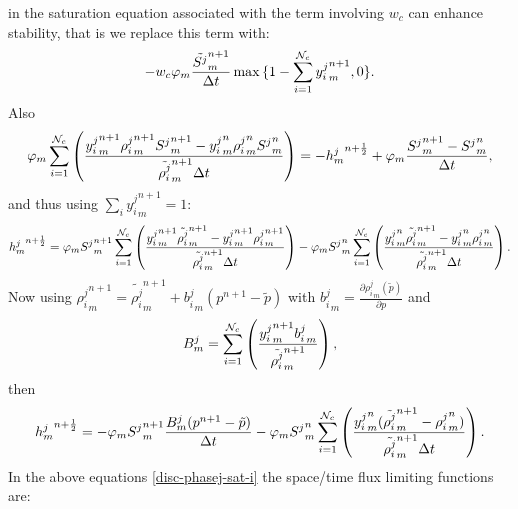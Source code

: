 in the saturation equation associated with the term involving $w_c$ can enhance 
stability, that is we replace this term with: 
\begin{eqnarray}
-w_c \phi_m\frac{\tilde{ S^j}_m^{n+1}}{\Delta t}  \max{ \{
1- \sum_{i=1}^{{\cal N}_c} { y_{i}^{j}}_m^{n+1} , 0\} }  . 
\end{eqnarray} 
Also
\begin{eqnarray}
\phi_m \sum_{i=1}^{{\cal N}_c} \left(
\frac{ {y_{i}^{j}}_m^{n+1} {\rho_{i}^{j}}_m^{n+1} { S^j}_m^{n+1}
- {y_{i}^{j}}_m^{n} {\rho_{i}^{j}}_m^{n} { S^j}_m^{n}
}
{\tilde{\rho_{i}^{j}}_m^{n+1} \Delta t} 
\right)
= -{h^j_m}^{n+\frac{1}{2}} + \phi_m \frac{{ S^j}_m^{n+1}-{ S^j}_m^{n}}{\Delta t} , 
\end{eqnarray}
and thus using $\sum_i {y_{i}^{j}}_m^{n+1}=1$: 
\begin{eqnarray}
{h^j_m}^{n+\frac{1}{2}} =
\phi_m { S^j}_m^{n+1} \sum_{i=1}^{{\cal N}_c} \left(
\frac{ {y_{i}^{j}}_m^{n+1} \tilde{\rho_{i}^{j}}_m^{n+1} 
- {y_{i}^{j}}_m^{n+1} {\rho_{i}^{j}}_m^{n+1} 
}
{\tilde{\rho_{i}^{j}}_m^{n+1} \Delta t}
\right)
- 
\phi_m { S^j}_m^{n} \sum_{i=1}^{{\cal N}_c} \left(
\frac{ {y_{i}^{j}}_m^{n} \tilde{\rho_{i}^{j}}_m^{n+1} 
- {y_{i}^{j}}_m^{n} {\rho_{i}^{j}}_m^{n} 
}
{\tilde{\rho_{i}^{j}}_m^{n+1} \Delta t}
\right). 
\end{eqnarray}
Now using ${\rho_{i}^{j}}_m^{n+1}=\tilde{\rho_{i}^{j}}_m^{n+1} + {b_i^j}_m (p^{n+1}-\tilde{p})$ 
with ${b_i^j}_m =\frac{\partial{\rho_{i}^{j}}_m (\tilde{p}) }{\partial p} $ and 
\begin{eqnarray}
B^j_m=\sum_{i=1}^{{\cal N}_c} \left(
\frac{ 
{y_{i}^{j}}_m^{n+1} {b_i^j}_m   }
{\tilde{\rho_{i}^{j}}_m^{n+1}}
\right), 
\end{eqnarray}
then
\begin{eqnarray}
{h^j_m}^{n+\frac{1}{2}} =
-\phi_m { S^j}_m^{n+1} \frac{ B^j_m (p^{n+1}-\tilde{p})}{\Delta t} 
- 
\phi_m { S^j}_m^{n} \sum_{i=1}^{{\cal N}_c} \left(
\frac{ {y_{i}^{j}}_m^{n} (\tilde{\rho_{i}^{j}}_m^{n+1} 
-  {\rho_{i}^{j}}_m^{n} )
}
{\tilde{\rho_{i}^{j}}_m^{n+1} \Delta t}
\right).
\end{eqnarray}
In the above equations \ref{disc-phasej-sat-i} the space/time flux limiting functions are: 





